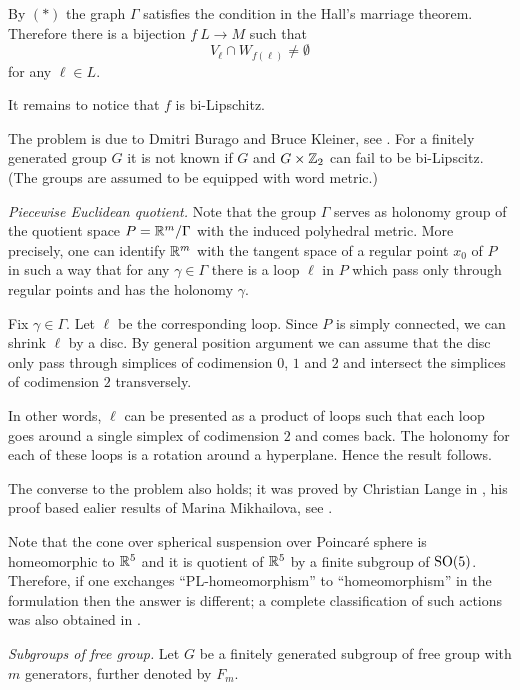 By $({*})$ the graph $\Gamma$ satisfies the condition in the Hall's marriage theorem.
Therefore there is a bijection $f\: L\to M$ such that 
\[V_\ell\cap W_{f(\ell)}\ne\emptyset\] for any $\ell\in L$. 

It remains to notice that $f$ is bi-Lipschitz.

 The problem is due to 
Dmitri Burago 
and Bruce Kleiner,
see \cite{burago-kleiner}. 
For a finitely generated group $G$  
it is not known if $G$ and $G\times \mathbb{Z}_2$ can fail to be bi-Lipscitz.
(The groups are assumed to be equipped with word metric.)
 



\textit{Piecewise Euclidean quotient.}
Note that the group $\Gamma$ serves as holonomy group of the quotient space $P=\mathbb{R}^m/\Gamma$ with the induced polyhedral metric.
More precisely, one can identify $\mathbb{R}^m$ with the tangent space of a regular point $x_0$ of $P$ in such a way that
for any $\gamma\in\Gamma$ there is a loop $\ell$ in $P$ which pass only through regular points and has the holonomy $\gamma$.

Fix $\gamma\in\Gamma$. 
Let $\ell$ be the corresponding loop.
Since $P$ is simply connected, we can shrink $\ell$ by a disc.
By general position argument we can assume that the disc 
only pass through simplices of codimension $0$, $1$ and $2$
and intersect the simplices of codimension $2$ transversely.

In other words, $\ell$ can be presented as a product of 
loops such that each loop goes around a single simplex of codimension $2$ and comes back.
The holonomy for each of these loops is a rotation around a hyperplane.
Hence the result follows.

The converse to the problem also holds;
it was proved by Christian Lange in \cite{lange},
his proof based ealier results of 
Marina Mikhailova, see \cite{mikhailova}.

Note that the cone over spherical suspension over Poincar\'e sphere is homeomorphic to $\mathbb{R}^5$ and it is quotient of $\mathbb{R}^5$ by a finite subgroup of $\mathrm{SO}(5)$. 
Therefore, if one exchanges ``PL-homeomorphism'' to ``homeomorphism'' in the formulation then the answer is different; 
a complete classification of such actions was also obtained in \cite{lange}.

\textit{Subgroups of free group.}
Let $G$ be a finitely generated subgroup of free group with $m$ generators, further denoted by $F_m$.

